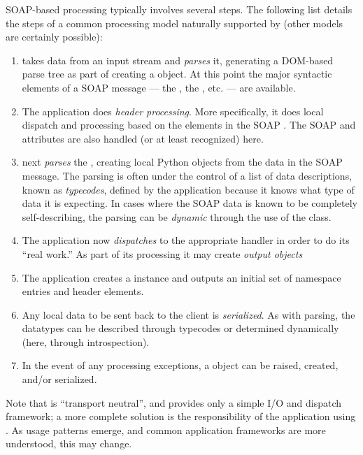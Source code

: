SOAP-based processing typically involves several steps.
The following list details the steps of a common processing model naturally
supported by \ZSI{} (other models are certainly possible):
\begin{enumerate}
\item
    \ZSI{} takes data from an input stream and \emph{parses} it, generating
    a DOM-based parse tree as part of creating a  object.
    At this point the major syntactic elements of a SOAP message --- the
    , the , etc. --- are available.
\item
    The application does \emph{header processing}.
    More specifically, it does local dispatch and processing based on
    the elements in the SOAP .
    The SOAP  and  attributes are
    also handled (or at least recognized) here.
\item
    \ZSI{} next \emph{parses} the , creating local Python objects
    from the data in the SOAP message.
    The parsing is often under the control of a list of data descriptions,
    known as \emph{typecodes}, defined by the application because it knows
    what type of data it is expecting.
    In cases where the SOAP data is known to be completely self-describing,
    the parsing can be \emph{dynamic} through the use of the 
    class.
\item
    The application now \emph{dispatches} to the appropriate handler
    in order to do its ``real work.''
    As part of its processing it may create \emph{output objects}
\item
    The application creates a  instance and outputs
    an initial set of namespace entries and header elements.
\item
    Any local data to be sent back to the client is \emph{serialized}.
    As with  parsing, the datatypes can be described through
    typecodes or determined dynamically (here, through introspection).
\item
    In the event of any processing exceptions, a  object
    can be raised, created, and/or serialized.
\end{enumerate}

Note that \ZSI{} is ``transport neutral'', and provides only a simple
I/O and dispatch framework; a more complete solution is the
responsibility of the application using \ZSI{}.
As usage patterns emerge, and common application frameworks are
more understood, this may change.

